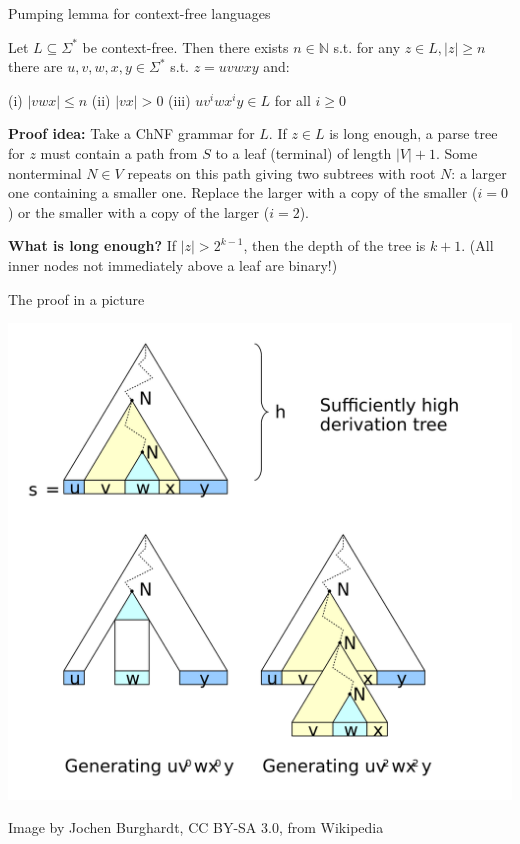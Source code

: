 \documentclass[handout]{beamer}
\begin{document}
\begin{frame}{Pumping lemma for context-free languages}

	\begin{theorem}
		Let $L\subseteq\Sigma^*$ be context-free. Then there exists $n\in\mathbb N$ s.t. for any $z\in L, |z|\geq n$ there are $u,v,w,x,y\in\Sigma^*$ s.t. $z=uvwxy$ and:
		
		(i) $|vwx|\leq n $ \hfill (ii) $|vx|>0$ \hfill (iii) $uv^iwx^iy\in L$ for all $i\geq 0$
	\end{theorem}

	\textbf{Proof idea:} Take a ChNF grammar for $L$. If $z\in L$ is long enough, a parse tree for $z$ must contain a path from $S$ to a leaf (terminal) of length $|V|+1$. Some nonterminal $N\in V$ repeats on this path giving two subtrees with root $N$: a larger one containing a smaller one. Replace the larger with a copy of the smaller ($i=0$) or the smaller with a copy of the larger ($i=2$).

	\textbf{What is long enough?} If $|z|>2^{k-1}$, then the depth of the tree is $k+1$. (All inner nodes not immediately above a leaf are binary!) 

\end{frame}


\begin{frame}{The proof in a picture}

	\vspace{-6pt}
	\begin{center}
		\includegraphics[height=0.92\textheight]{files/pumping-lemma-for-context-free-languages.png}
	\end{center}
	\vspace{-12pt}
	{\footnotesize Image by Jochen Burghardt, CC BY-SA 3.0, from Wikipedia}
		
	
\end{frame}
\end{document}

